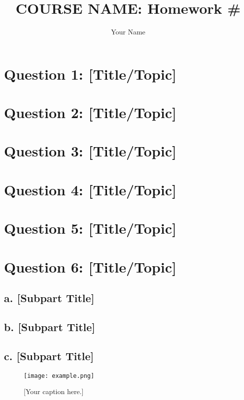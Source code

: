 \documentclass[11pt]{article}
\title{COURSE NAME: Homework \#}
\author{Your Name}
\begin{document}
\maketitle

\section*{Question 1: [Title/Topic]}

\section*{Question 2: [Title/Topic]}

\section*{Question 3: [Title/Topic]}

\section*{Question 4: [Title/Topic]}

\section*{Question 5: [Title/Topic]}

\section*{Question 6: [Title/Topic]}

\subsection*{a. [Subpart Title]}

\subsection*{b. [Subpart Title]}

\subsection*{c. [Subpart Title]}
\noindent
\begin{figure}[h!]
\centering
\texttt{[image: example.png]}
\caption{[Your caption here.]}
\label{fig:example}
\end{figure}
\end{document}
